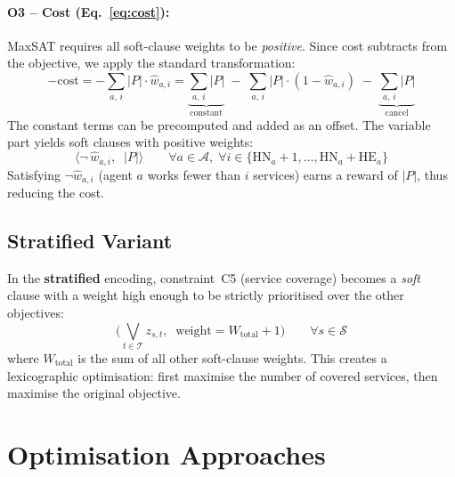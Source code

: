 \documentclass[11pt,a4paper]{article}
\newcommand{\setA}{\mathcal{A}}
\newcommand{\setS}{\mathcal{S}}
\newcommand{\setT}{\mathcal{T}}
\newcommand{\HN}{\mathrm{HN}}
\newcommand{\HE}{\mathrm{HE}}
\begin{document}
\paragraph{O3 -- Cost (Eq.~\ref{eq:cost}):}
MaxSAT requires all soft-clause weights to be \emph{positive}.
Since cost subtracts from the objective, we apply the standard transformation:
\begin{equation}\label{eq:cost-transform}
    -\text{cost}
    = -\!\sum_{a,\,i} |P| \cdot \hat{w}_{a,i}
    = \underbrace{\sum_{a,\,i} |P|}_{\text{constant}}
      \;-\; \sum_{a,\,i} |P| \cdot (1 - \hat{w}_{a,i})
      \;-\; \underbrace{\sum_{a,\,i} |P|}_{\text{cancel}}
\end{equation}
The constant terms can be precomputed and added as an offset.
The variable part yields soft clauses with positive weights:
\begin{equation}\label{eq:soft-extra}
    \bigl\langle \neg\, \hat{w}_{a,i},\;\; |P| \bigr\rangle \qquad
    \forall a \in \setA,\;
    \forall i \in \{\HN_a + 1,\ldots, \HN_a + \HE_a\}
\end{equation}
Satisfying $\neg \hat{w}_{a,i}$ (agent $a$ works fewer than $i$ services)
earns a reward of $|P|$, thus reducing the cost.

\subsection{Stratified Variant}

In the \textbf{stratified} encoding, constraint~C5 (service coverage) becomes
a \emph{soft} clause with a weight high enough to be strictly prioritised over
the other objectives:
\begin{equation}\label{eq:cov-soft}
    \biggl(\bigvee_{t \in \setT} z_{s,t},\;\;
    \text{weight} = W_{\text{total}} + 1\biggr)
    \qquad \forall s \in \setS
\end{equation}
where $W_{\text{total}}$ is the sum of all other soft-clause weights.
This creates a lexicographic optimisation: first maximise the number of covered
services, then maximise the original objective.


\section{Optimisation Approaches}\label{sec:optimisation}
\end{document}
